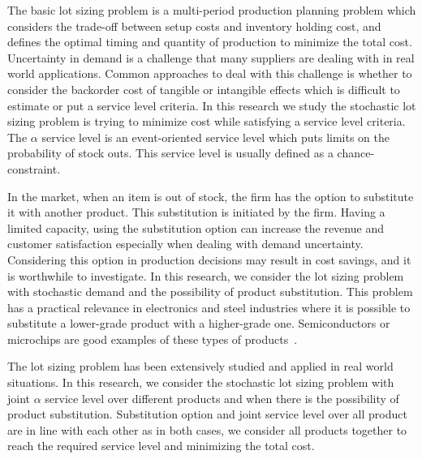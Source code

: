 \documentclass[10pt]{article}
\begin{document}
The basic lot sizing problem is a multi-period production planning problem which considers the trade-off between setup costs and inventory holding cost, and defines the optimal timing and quantity of production to minimize the total cost. 
Uncertainty in demand is a challenge that many suppliers are dealing with in real world applications. 
Common approaches to deal with this challenge is whether to consider the backorder cost of tangible or intangible effects which is difficult to estimate or put a service level criteria. 
In this research we study the stochastic lot sizing problem is trying to minimize cost while satisfying a service level criteria. The $\alpha$ service level is an event-oriented service level which puts limits on the probability of stock outs. This service level is usually defined as a chance-constraint. 

In the market, when an item is out of stock, the firm has the option to substitute it with another product. This substitution is initiated by the firm. Having a limited capacity, using the substitution option can increase the revenue and customer satisfaction especially when dealing with demand uncertainty. Considering this option in production decisions may result in cost savings, and it is worthwhile to investigate. In this research, we consider the  lot sizing problem with stochastic demand and the possibility of product substitution. This problem has a practical relevance in electronics and steel industries where it is possible to substitute a lower-grade product with a higher-grade one. Semiconductors or microchips are good examples of these types of products~\cite{lang2010efficient}. 

The lot sizing problem has been extensively studied and applied in real world situations. 
In this research, we consider the stochastic lot sizing problem with joint $\alpha$ service level over different products and when there is the possibility of product substitution. Substitution option and joint service level over all product are in line with each other as in both cases, we consider all products together to reach the required service level and minimizing the total cost. 
\end{document}
